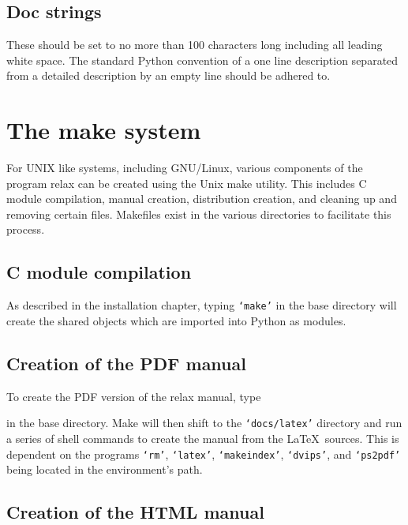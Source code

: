 \subsection{Doc strings}

These should be set to no more than 100 characters long including all leading white space.  The standard Python convention of a one line description separated from a detailed description by an empty line should be adhered to.




\section{The make system}

For UNIX like systems, including GNU/Linux, various components of the program relax can be created using the Unix make utility.  This includes C module compilation, manual creation, distribution creation, and cleaning up and removing certain files.  Makefiles exist in the various directories to facilitate this process.


\subsection{C module compilation}

As described in the installation chapter, typing \texttt{`make'} in the base directory will create the shared objects which are imported into Python as modules.


\subsection{Creation of the PDF manual}

To create the PDF version of the relax manual, type


in the base directory.  Make will then shift to the \texttt{`docs/latex'} directory and run a series of shell commands to create the manual from the \LaTeX\ sources.  This is dependent on the programs \texttt{`rm'}, \texttt{`latex'}, \texttt{`makeindex'}, \texttt{`dvips'}, and \texttt{`ps2pdf'} being located in the environment's path.


\subsection{Creation of the HTML manual}

